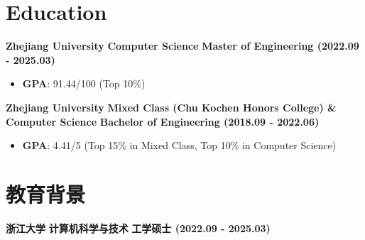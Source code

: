 \ifdefined\english

    \section*{Education}

    \noindent \textbf{Zhejiang University} \textbar{} \textbf{Computer Science} \textbar{} \textbf{Master of Engineering (2022.09 - 2025.03)}

    \begin{itemize}
        \item \textbf{GPA}: 91.44/100 (Top 10\%)
    \end{itemize}

    \noindent \textbf{Zhejiang University} \textbar{} \textbf{Mixed Class (Chu Kochen Honors College) \& Computer Science} \textbar{} \textbf{Bachelor of Engineering (2018.09 - 2022.06)}

    \begin{itemize}
        \item \textbf{GPA}: 4.41/5 (Top 15\% in Mixed Class, Top 10\% in Computer Science)
    \end{itemize}

\else

    \section*{教育背景}

    \noindent \textbf{浙江大学} \textbar{} \textbf{计算机科学与技术} \textbar{} \textbf{工学硕士 (2022.09 - 2025.03)}

